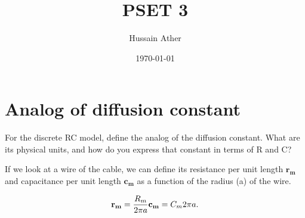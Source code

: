 \documentclass[aps,prd,reprint]{revtex4-1}
\begin{document}
\title{PSET 3}

\author{Hussain Ather}

\date{\today}

\section{Analog of diffusion constant}\label{sec:intro}

For the discrete RC model, define the analog of the diffusion constant. What are its physical units, and how do you express that constant in terms of R and C?

If we look at a wire of the cable, we can define its resistance per unit length $\mathbf{r_m}$ and capacitance per unit length  $\mathbf{c_m}$ as a function of the radius (a) of the wire. 

\begin{equation}
\mathbf{r_m} = \frac{R_m}{2\pi a} \\
\mathbf{c_m} = {C_m2\pi a}.
\end{equation}
\end{document}
